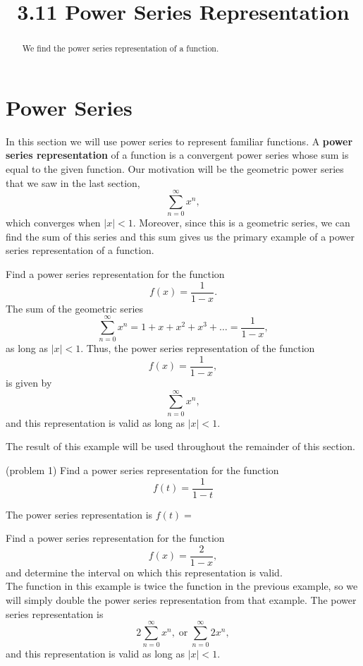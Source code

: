 \documentclass[handout]{ximera}
\title{3.11 Power Series Representation}
\begin{document}
\begin{abstract}
We find the power series representation of a function.
\end{abstract}

\maketitle

\section{Power Series}

In this section we will use power series to represent familiar functions.
A \textbf{power series representation} of a function is a convergent power series whose sum is equal to the given function.
Our motivation will be the geometric power series that we saw in the last section,
\[
\sum_{n=0}^\infty x^n,
\]
which converges when $|x| < 1$. Moreover, since this is a geometric series, we can find the sum of this series
and this sum gives us the primary example of a power series representation of a function.

\begin{example}[example 1]
Find a power series representation for the function 
\[
f(x) = \frac{1}{1-x}.
\]
The sum of the geometric series
\[
\sum_{n=0}^\infty x^n = 1 + x + x^2 + x^3 + \dots =  \frac{1}{1-x},
\]
as long as $|x| < 1$.  Thus, the power series representation of the function 
\[
f(x) = \frac{1}{1-x},
\]
is given by 
\[
\sum_{n=0}^\infty x^n,
\]
and this representation is valid as long as $|x| < 1$.
\end{example}

The result of this example will be used throughout the remainder of this section.


\begin{problem}(problem 1)
Find a power series representation for the function
\[
f(t) = \frac{1}{1-t}
\]

The power series representation is $f(t) = $
\begin{multipleChoice}
\end{multipleChoice}
\end{problem}




\begin{example}[example 2]
Find a power series representation for the function
\[
f(x) = \frac{2}{1-x},
\]
and determine the interval on which this representation is valid.\\
The function in this example is twice the function in the previous example, 
so we will simply double the power series representation from that example.
The power series representation is
\[
2\sum_{n=0}^\infty x^n,  \; \text{or} \; \sum_{n=0}^\infty 2x^n,
\]
and this representation is valid as long as $|x| < 1$.

\end{example}
\end{document}
